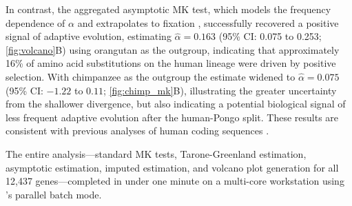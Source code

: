 In contrast, the aggregated asymptotic MK test,
which models the frequency dependence of $\alpha$
and extrapolates to fixation \citep{messer2013},
successfully recovered a positive signal of adaptive evolution,
estimating $\hat{\alpha} = 0.163$
(95\% CI: 0.075 to 0.253; \cref{fig:volcano}B)
using orangutan as the outgroup,
indicating that approximately 16\% of amino acid substitutions
on the human lineage were driven by positive selection.
With chimpanzee as the outgroup the estimate widened to
$\hat{\alpha} = 0.075$ (95\% CI: $-1.22$ to $0.11$;
\cref{fig:chimp_mk}B),
illustrating the greater uncertainty
from the shallower divergence, but also indicating 
a potential biological signal of less frequent adaptive evolution
after the human-Pongo split. 
These results are consistent with previous analyses
of human coding sequences \citep{messer2013}.

The entire analysis---standard MK tests,
Tarone-Greenland estimation, asymptotic estimation,
imputed estimation,
and volcano plot generation for all 12,437 genes---completed
in under one minute on a multi-core workstation
using \mkado's parallel batch mode.
